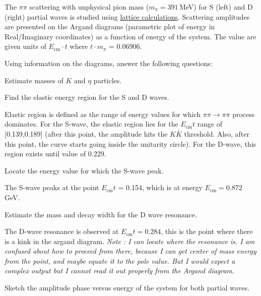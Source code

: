 
The $\pi\pi$ scattering with
unphysical pion mass ($m_\pi=391\,$MeV) for S (left) and D (right) partial waves
is studied using \href{https://inspirehep.net/literature/1618009}{lattice calculations}.
Scattering amplitudes are presented on the Argand diagrams
(parametric plot of energy in Real/Imaginary coordinates) as a function of energy of the system.
The value are given units of $E_\text{cm} \cdot t$ where $t \cdot m_\pi$ = 0.06906.


Using information on the diagrams, answer the following questions:
\be
\item Estimate masses of $K$ and $\eta$ particles.
\item Find the elastic energy region for the S and D waves.

\begin{solution}
	Elastic region is defined as the range of energy values for which $\pi\pi \rightarrow \pi\pi$ process dominates. For the S-wave, the elastic region lies for the $E_\text{cm}t$ range of [0.139,0.189] (after this point, the amplitude hits the $K\bar{K}$ threshold. Also, after this point, the curve starts going inside the unitarity circle). For the D-wave, this region exists until value of 0.229.
\end{solution}
\item Locate the energy value for which the S-wave peak.

\begin{solution}
	The S-wave peaks at the point $E_\text{cm}t$ = 0.154, which is at energy $E_\text{cm} = 0.872$ GeV.
\end{solution}
\item Estimate the mass and decay width for the D wave resonance.

\begin{solution}
	The D-wave resonance is observed at $E_\text{cm}t = 0.284$, this is the point where there is a kink in the argand diagram. \textit{Note : I can locate where the resonance is. I am confused about how to proceed from there, because I can get center of mass energy from the point, and maybe equate it to the pole value. But I would expect a complex output but I cannot read it out properly from the Argand diagram}.
\end{solution}

\item Sketch the amplitude phase versus energy of the system for both partial waves.
\ee